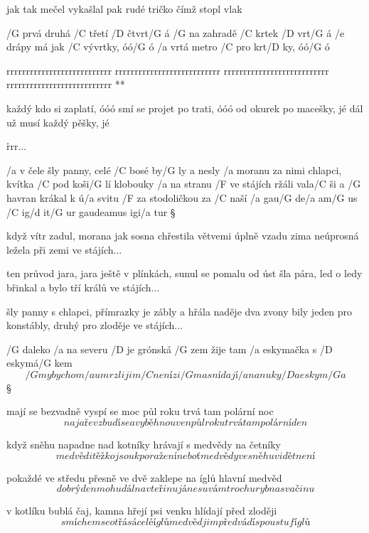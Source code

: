 jak tak mečel
vykašlal pak
rudé tričko
čímž stopl vlak




/G prvá druhá /C třetí /D čtvrt/G á
/G na zahradě /C krtek /D vrt/G á
/e drápy má jak /C vývrtky, óó/G ó
/a vrtá metro /C pro krt/D ky, óó/G ó

\R rrrrrrrrrrrrrrrrrrrrrrrrrrr
   rrrrrrrrrrrrrrrrrrrrrrrrrrr
   rrrrrrrrrrrrrrrrrrrrrrrrrrr
   rrrrrrrrrrrrrrrrrrrrrrrrrrr **

každý kdo si zaplatí, óóó
smí se projet po trati, óóó
od okurek po macešky, jé
dál už musí každý pěšky, jé

\r rrr...




/a v čele šly panny, celé /C bosé by/G ly a nesly /a moranu
za nimi chlapci, kvítka /C pod koši/G lí klobouky /a na stranu
/F ve stájích ržáli vala/C ši a /G havran krákal k ú/a svitu
/F za stodoličkou za /C naší
/a gau/G de/a am/G us /C ig/d it/G ur
gaudeamus igi/a tur \S

když vítr zadul, morana jak sosna chřestila větvemi
úplně vzadu zima neúprosná ležela při zemi
ve stájích... \s

ten průvod jara, jara ještě v plínkách, sunul se pomalu
od úst šla pára, led o ledy břinkal a bylo tří králů
ve stájích... \s

šly panny s chlapci, přímrazky je zábly a hřála naděje
dva zvony bily jeden pro konstábly, druhý pro zloděje
ve stájích...




/G daleko /a na severu /D je grónská /G zem
žije tam /a eskymačka s /D eskymá/G kem
\[ /G my bychom /a umrzli jim /C není zi/G ma
snídají /a nanuky /D a eskym/G a \]\S

mají se bezvadně vyspí se moc
půl roku trvá tam polární noc
\[ na jaře vzbudí se a vyběhnou ven
půl roku trvá tam polární den \]\s

když sněhu napadne nad kotníky
hrávají s medvědy na četníky
\[ medvědi těžko jsou k poražení
neboť medvědy ve sněhu vidět není \]\s

pokaždé ve středu přesně ve dvě
zaklepe na íglů hlavní medvěd
\[ dobrý den mohu dál na vteřinu
já nesu vám trochu ryb na svačinu \]\s

v kotlíku bublá čaj, kamna hřejí
psi venku hlídají před zloději
\[ smíchem se otřásá celé íglů
medvěd jim předvádí spoustu fíglů \]\s

